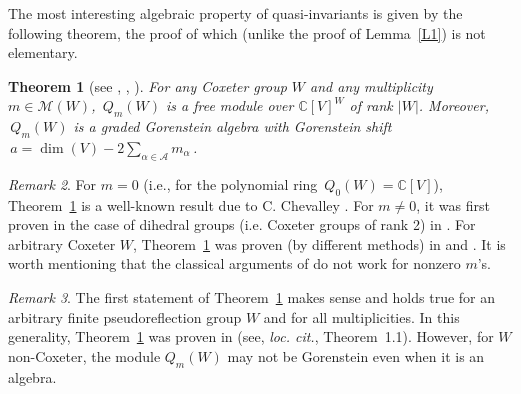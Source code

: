 \documentclass[11pt]{amsart}
\newtheorem{theorem}{Theorem}[section]
\theoremstyle{definition}
\theoremstyle{remark}
\newtheorem{remark}[theorem]{Remark}
\numberwithin{equation}{section}
\newcommand{\la}{\label}
\def\c{\mathbb{C}}
\def\A{\mathcal{A}}
\def\M{\mathcal{M}}
\begin{document}
The most interesting algebraic property of quasi-invariants is given by the following theorem, the proof of which (unlike the proof of Lemma~\ref{L1}) is not elementary.
%
\begin{theorem}[see \cite{FV02}, \cite{EG02b}, \cite{BEG03}]
\la{TGoren}
For any Coxeter group $W$ and any multiplicity $ m \in \M(W) $, $\,Q_m(W) $ is a free module over $ \c[V]^W $ of rank $ |W| $. Moreover, $\,Q_m(W) $ is a graded Gorenstein algebra with Gorenstein shift $\,a = \dim(V) - 2 \sum_{\alpha \in \A} m_{\alpha} \,$. 
\end{theorem}
%
\begin{remark}
For $m=0$ (i.e., for the polynomial ring $\, Q_0(W) = \c[V]$), Theorem~\ref{TGoren} is a well-known result due to C. Chevalley \cite{Che55}. For $ m \not= 0 $, it was first proven in the case of dihedral groups (i.e. Coxeter groups of rank 2) in \cite{FV02}. For arbitrary Coxeter $W$, Theorem~\ref{TGoren} was proven (by different methods) in \cite{EG02b} and \cite{BEG03}. It is worth mentioning that the classical arguments of \cite{Che55}  do not work for nonzero $m$'s.
\end{remark}
%
\begin{remark}
The first statement of Theorem~\ref{TGoren} makes sense and holds true for an arbitrary finite pseudoreflection group $W$ and for all multiplicities. In this generality, Theorem~\ref{TGoren} was proven in \cite{BC11} (see, {\it loc. cit.}, Theorem~1.1). However, for $W$ non-Coxeter, the module $Q_m(W)$ may not be Gorenstein even when it is an algebra.
\end{remark}
%
\end{document}
